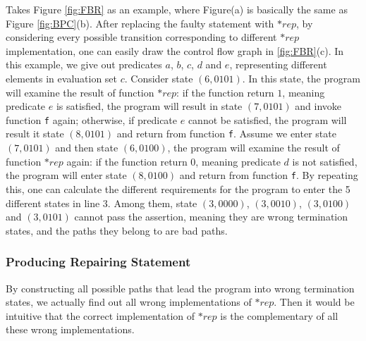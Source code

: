 Takes Figure \ref{fig:FBR} as an example, where Figure(a) is basically the same as Figure \ref{fig:BPC}(b). After replacing the faulty statement with $*rep$, by considering every possible transition corresponding to different $*rep$ implementation, one can easily draw the control flow graph in \ref{fig:FBR}(c). In this example, we give out predicates $a$, $b$, $c$, $d$ and $e$, representing different elements in evaluation set $c$.
Consider state $(6,0101)$. In this state, the program will examine the result of function $*rep$: if the function return $1$, meaning predicate $e$ is satisfied, the program will result in state $(7,0101)$ and invoke function \lstinline|f| again; otherwise, if predicate $e$ cannot be satisfied, the program will result it state $(8,0101)$ and return from function \lstinline|f|.
Assume we enter state $(7,0101)$ and then state $(6,0100)$, the program will examine the result of function $*rep$ again: if the function return $0$, meaning predicate $d$ is not satisfied, the program will enter state $(8,0100)$ and return from function \lstinline|f|.
By repeating this, one can calculate the different requirements for the program to enter the 5 different states in line $3$. Among them, state $(3,0000)$, $(3,0010)$, $(3,0100)$ and $(3,0101)$ cannot pass the assertion, meaning they are wrong termination states, and the paths they belong to are bad paths.

\subsubsection{Producing Repairing Statement}
\label{section:ProducingRepairingStatement}
By constructing all possible paths that lead the program into wrong termination states, we actually find out all wrong implementations of $*rep$.
Then it would be intuitive that the correct implementation of $*rep$ is the complementary of all these wrong implementations.

